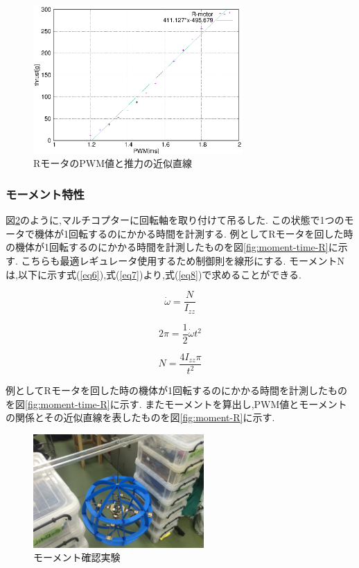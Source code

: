 \documentclass[12pt,oneside]{sotsuken_paper}
\begin{document}
\begin{figure}[htbp]
	\begin{center}
		\includegraphics[width=80mm]{image/thrust/thrust-R-kinji.eps}
		\caption{RモータのPWM値と推力の近似直線}
		\label{fig:thrust-R-kinji}
	\end{center}
\end{figure}

\subsubsection{モーメント特性}
図\ref{fig:moment-test}のように,マルチコプターに回転軸を取り付けて吊るした.
この状態で1つのモータで機体が1回転するのにかかる時間を計測する.
例としてRモータを回した時の機体が1回転するのにかかる時間を計測したものを図\ref{fig:moment-time-R}に示す.
こちらも最適レギュレータ使用するため制御則を線形にする.
モーメントNは,以下に示す式(\ref{eq6}),式(\ref{eq7})より,式(\ref{eq8})で求めることができる.

\begin{equation}
	\dot{\omega} = \frac{N}{I_{zz}}
	\label{eq6}
\end{equation}

\begin{equation}
	2\pi = \frac{1}{2}\dot{\omega}{t^2}
	\label{eq7}
\end{equation}

\begin{equation}
	N = \frac{4{I_{zz}}\pi}{t^2}
	\label{eq8}
\end{equation}


例としてRモータを回した時の機体が1回転するのにかかる時間を計測したものを図\ref{fig:moment-time-R}に示す.
またモーメントを算出し,PWM値とモーメントの関係とその近似直線を表したものを図\ref{fig:moment-R}に示す.

\begin{figure}[htbp]
	\begin{center}
		\includegraphics[width=65mm]{image/moment/moment-test.jpg}
		\caption{モーメント確認実験}
		\label{fig:moment-test}
	\end{center}
\end{figure}
\end{document}
